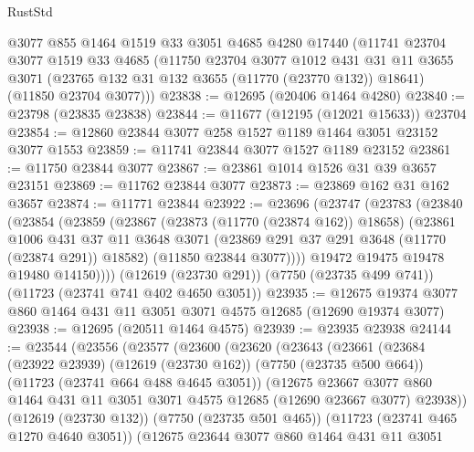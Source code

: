 \begin{lexlean}{RustStd}
\begin{coremodule}
    @3077
    @855
    @1464
    @1519
    @33
    @3051
    @4685
    @4280
    @17440
    (@11741
      @23704
      @3077
      @1519
      @33
      @4685
      (@11750
        @23704
        @3077
        @1012
        @431
        @31
        @11
        @3655
        @3071
        (@23765 @132 @31 @132 @3655 (@11770 (@23770 @132)) @18641)
        (@11850 @23704 @3077)))
@23838 := @12695 (@20406 @1464 @4280)
@23840 := @23798 (@23835 @23838)
@23844 := @11677 (@12195 (@12021 @15633)) @23704
@23854 := @12860 @23844 @3077 @258 @1527 @1189 @1464 @3051 @23152 @3077 @1553
@23859 := @11741 @23844 @3077 @1527 @1189 @23152
@23861 := @11750 @23844 @3077
@23867 := @23861 @1014 @1526 @31 @39 @3657 @23151
@23869 := @11762 @23844 @3077
@23873 := @23869 @162 @31 @162 @3657
@23874 := @11771 @23844
@23922 := @23696
    (@23747
      (@23783
        (@23840
          (@23854
            (@23859
              (@23867
                (@23873 (@11770 (@23874 @162)) @18658)
                (@23861
                  @1006
                  @431
                  @37
                  @11
                  @3648
                  @3071
                  (@23869 @291 @37 @291 @3648 (@11770 (@23874 @291)) @18582)
                  (@11850 @23844 @3077))))
            @19472
            @19475
            @19478
            @19480
            @14150))))
    (@12619 (@23730 @291))
    (@7750 (@23735 @499 @741))
    (@11723 (@23741 @741 @402 @4650 @3051))
@23935 := @12675 @19374 @3077 @860 @1464 @431 @11 @3051 @3071 @4575 @12685 (@12690 @19374 @3077)
@23938 := @12695 (@20511 @1464 @4575)
@23939 := @23935 @23938
@24144 := @23544
    (@23556
      (@23577
        (@23600
          (@23620
            (@23643
              (@23661
                (@23684
                  (@23922 @23939)
                  (@12619 (@23730 @162))
                  (@7750 (@23735 @500 @664))
                  (@11723 (@23741 @664 @488 @4645 @3051))
                  (@12675
                    @23667
                    @3077
                    @860
                    @1464
                    @431
                    @11
                    @3051
                    @3071
                    @4575
                    @12685
                    (@12690 @23667 @3077)
                    @23938))
                (@12619 (@23730 @132))
                (@7750 (@23735 @501 @465))
                (@11723 (@23741 @465 @1270 @4640 @3051))
                (@12675
                  @23644
                  @3077
                  @860
                  @1464
                  @431
                  @11
                  @3051

\end{coremodule}
\end{lexlean}
